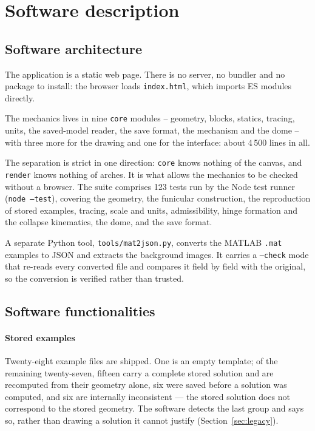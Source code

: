 \documentclass[final,3p,times,twocolumn]{elsarticle}
\begin{document}

\section{Software description}

\subsection{Software architecture}

The application is a static web page. There is no server, no bundler and no
package to install: the browser loads \texttt{index.html}, which imports ES
modules directly.

The mechanics lives in nine \texttt{core} modules -- geometry, blocks,
statics, tracing, units, the saved-model reader, the save format, the
mechanism and the dome -- with three more for the drawing and one for the
interface: about 4\,500 lines in all.

The separation is strict in one direction: \texttt{core} knows nothing of the
canvas, and \texttt{render} knows nothing of arches. It is what allows the
mechanics to be checked without a browser. The suite comprises 123 tests run by
the Node test runner (\texttt{node --test}), covering the geometry, the
funicular construction, the reproduction of stored examples, tracing, scale and
units, admissibility, hinge formation and the collapse kinematics, the dome,
and the save format.

A separate Python tool, \texttt{tools/mat2json.py}, converts the MATLAB
\texttt{.mat} examples to JSON and extracts the background images. It carries
a \texttt{--check} mode that re-reads every converted file and compares it
field by field with the original, so the conversion is verified rather than
trusted.

\subsection{Software functionalities}

\paragraph{Stored examples} Twenty-eight example files are shipped. One is an
empty template; of the remaining twenty-seven, fifteen carry a complete stored
solution and are recomputed from their geometry alone, six were saved before a
solution was computed, and six are internally inconsistent --- the stored
solution does not correspond to the stored geometry. The software detects the
last group and says so, rather than drawing a solution it cannot justify
(Section~\ref{sec:legacy}).
\end{document}
